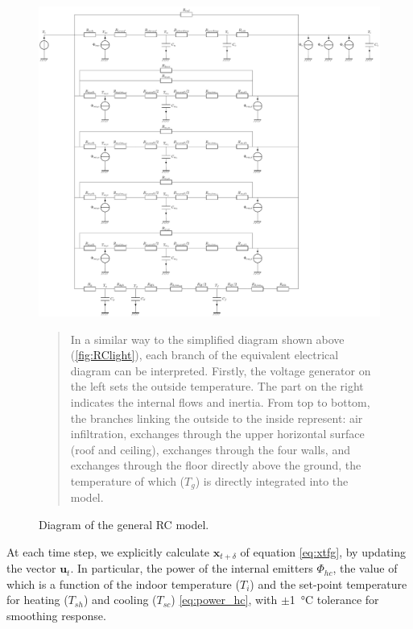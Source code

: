 \documentclass[11pt]{article}
\begin{document}
        \begin{figure}[ht]
            \centering
            \includegraphics[width=0.99\columnwidth]{figures/genmod.pdf}
            \caption{\label{fig:rc_mod} Diagram of the general RC model.}
            \begin{quote}
                \vspace{-2mm}
                \small\noindent
                In a similar way to the simplified diagram shown above (\ref{fig:RClight}), each branch of the equivalent electrical diagram can be interpreted. Firstly, the voltage generator on the left sets the outside temperature. The part on the right indicates the internal flows and inertia. From top to bottom, the branches linking the outside to the inside represent: air infiltration, exchanges through the upper horizontal surface (roof and ceiling), exchanges through the four walls, and exchanges through the floor directly above the ground, the temperature of which ($T_g$) is directly integrated into the model. 
              \end{quote}
        \end{figure} 

        At each time step, we explicitly calculate $\mathbf{x}_{t+\delta}$ of equation \eqref{eq:xtfg}, by updating the vector $\mathbf{u}_{t}$. In particular, the power of the internal emitters $\Phi_{hc}$, the value of which is a function of the indoor temperature ($T_i$) and the set-point temperature for heating ($T_{sh}$) and cooling ($T_{sc}$) \eqref{eq:power_hc}, with $\pm$\SI{1}{\celsius} tolerance for smoothing response. 
\end{document}

